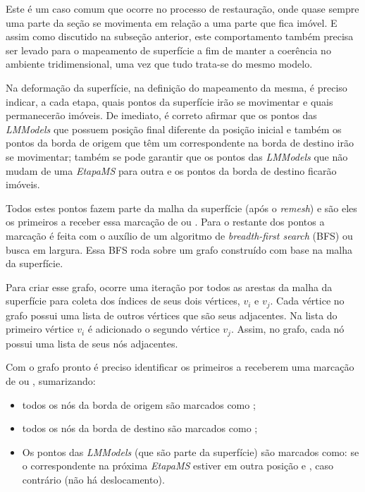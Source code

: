 Este é um caso comum que ocorre no processo de restauração, onde quase sempre uma parte da seção se movimenta em relação a uma parte que fica imóvel. E assim como discutido na subseção anterior, este comportamento também precisa ser levado para o mapeamento de superfície a fim de manter a coerência no ambiente tridimensional, uma vez que tudo trata-se do mesmo modelo.

Na deformação da superfície, na definição do mapeamento da mesma, é preciso indicar, a cada etapa, quais pontos da superfície irão se movimentar e quais permanecerão imóveis. De imediato, é correto afirmar que os pontos das \textit{LMModels} que possuem posição final diferente da posição inicial e também os pontos da borda de origem que têm um correspondente na borda de destino irão se movimentar; também se pode garantir que os pontos das \textit{LMModels} que não mudam de uma \textit{EtapaMS} para outra e os pontos da borda de destino ficarão imóveis.

Todos estes pontos fazem parte da malha da superfície (após o \textit{remesh}) e são eles os primeiros a receber essa marcação de  ou . Para o restante dos pontos a marcação é feita com o auxílio de um algoritmo de \textit{breadth-first search} (BFS) ou busca em largura. Essa BFS roda sobre um grafo construído com base na malha da superfície. 

Para criar esse grafo, ocorre uma iteração por todos as arestas da malha da superfície para coleta dos índices de seus dois vértices, $v_i$ e $v_j$. Cada vértice no grafo possui uma lista de outros vértices que são seus adjacentes. Na lista do primeiro vértice $v_i$ é adicionado o segundo vértice $v_j$. Assim, no grafo, cada nó possui uma lista de seus nós adjacentes.

Com o grafo pronto é preciso identificar os primeiros a receberem uma marcação de  ou , sumarizando:

\renewcommand{\labelitemi}{•}
\begin{itemize}
  \item todos os nós da borda de origem são marcados como ;
  \item todos os nós da borda de destino são marcados como ;
  \item Os pontos das \textit{LMModels} (que são parte da superfície) são marcados como:  se o correspondente na próxima \textit{EtapaMS} estiver em outra posição e , caso contrário (não há deslocamento).
\end{itemize}

